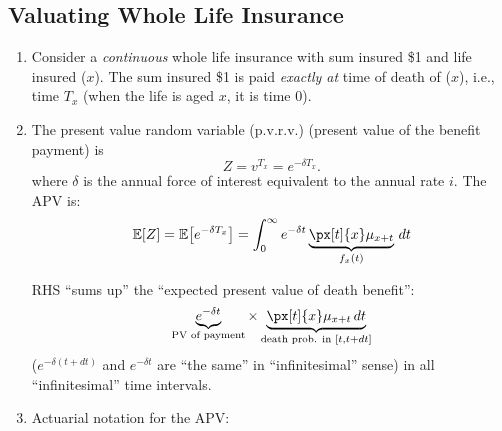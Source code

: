 \subsection{Valuating Whole Life Insurance}
\begin{enumerate}
\subsubsection*{Continuous Case}
\item Consider a \emph{continuous} whole life insurance with sum insured \$1
and life insured (\(x\)). The sum insured \$1 is paid \emph{exactly at} time of
death of (\(x\)), i.e., time \(T_x\) (when the life is aged \(x\), it is time
0).  \item The present value random variable (p.v.r.v.) (present value of the
benefit payment) is
\[
Z=v^{T_x}=e^{-\delta T_x}.
\]
where \(\delta\) is the annual force of interest equivalent to the annual rate
\(i\). The APV is:
\[
\expv{Z}=\expv{e^{-\delta T_x}}=\int_{0}^{\infty}e^{-\delta t}\underbrace{\px[t]{x}\mu_{x+t}}_{f_x(t)}\,dt
\]
\begin{intuition}
RHS ``sums up'' the ``expected present value of death benefit'':
\[\underbrace{e^{-\delta t}}_{\text{PV of payment}}\times \underbrace{\px[t]{x}\mu_{x+t}\,dt}_{\text{death prob. in }[t,t+dt]}\]
(\(e^{-\delta(t+dt)}\) and \(e^{-\delta t}\) are ``the same'' in
``infinitesimal'' sense) in all ``infinitesimal'' time intervals.
\end{intuition}
\item Actuarial notation for the APV:



\end{enumerate}

